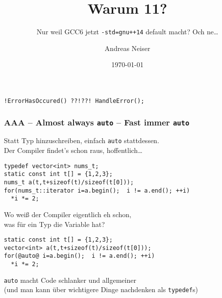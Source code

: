 \documentclass[t,ngerman,usepdftitle=false]{beamer}
\author{Andreas Neiser}
\title{Warum \Cpp{}11?}
\subtitle{Nur weil GCC6 jetzt \lstinline|-std=gnu++14| default macht? Och ne\ldots}
\date{\today}
\begin{document}
\begin{frame}[fragile]
  
    \maketitle
  
  \begin{center}
    \lstinline|!ErrorHasOccured() ??!??! HandleError();|
  \end{center}
\end{frame}


\begin{frame}[fragile]
  \frametitle{AAA -- Almost always \lstinline!auto! -- Fast immer \lstinline!auto! }
  Statt Typ hinzuschreiben, einfach \lstinline!auto! stattdessen. \\ Der Compiler findet's schon raus, hoffentlich\ldots
  
\begin{lstlisting}
typedef vector<int> nums_t; 
static const int t[] = {1,2,3};
nums_t a(t,t+sizeof(t)/sizeof(t[0])); 
for(nums_t::iterator i=a.begin();  i != a.end(); ++i)
  *i *= 2;
\end{lstlisting}

Wo weiß der Compiler eigentlich eh schon, \\ was für ein Typ die Variable hat?

\pause 
\begin{lstlisting}
static const int t[] = {1,2,3};
vector<int> a(t,t+sizeof(t)/sizeof(t[0])); 
for(@auto@ i=a.begin();  i != a.end(); ++i)
  *i *= 2;
\end{lstlisting}

\pause 
\begin{block}{}
  \centering
  \lstinline!auto! macht Code schlanker und allgemeiner\\ \small (und man kann über wichtigere Dinge nachdenken als \lstinline|typedef|s) 
\end{block}
  
\end{frame}
\end{document}
